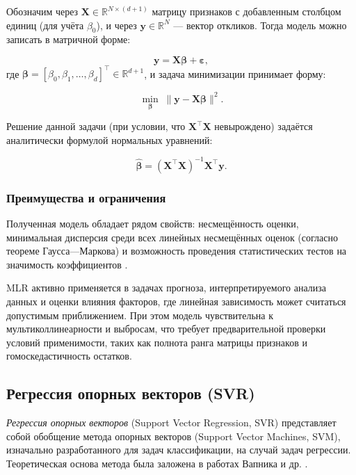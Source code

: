 Обозначим через $\mathbf{X} \in \mathbb{R}^{N \times (d+1)}$ матрицу признаков с добавленным столбцом единиц (для учёта $\beta_0$), и через $\mathbf{y} \in \mathbb{R}^N$ — вектор откликов. Тогда модель можно записать в матричной форме:

\begin{equation}
\mathbf{y} = \mathbf{X} \boldsymbol{\beta} + \boldsymbol{\varepsilon},
\end{equation}
где $\boldsymbol{\beta} = [\beta_0, \beta_1, \ldots, \beta_d]^\top \in \mathbb{R}^{d+1}$, и задача минимизации принимает форму:

\begin{equation}
\min_{\boldsymbol{\beta}} \; \| \mathbf{y} - \mathbf{X} \boldsymbol{\beta} \|^2.
\end{equation}

Решение данной задачи (при условии, что $\mathbf{X}^\top \mathbf{X}$ невырождено) задаётся аналитически формулой нормальных уравнений:

\begin{equation}
\hat{\boldsymbol{\beta}} = (\mathbf{X}^\top \mathbf{X})^{-1} \mathbf{X}^\top \mathbf{y}.
\end{equation}

\subsubsection{Преимущества и ограничения}

Полученная модель обладает рядом свойств: несмещённость оценки, минимальная дисперсия среди всех линейных несмещённых оценок (согласно теореме Гаусса—Маркова) и возможность проведения статистических тестов на значимость коэффициентов \cite{fisher1922, rao1973}.

MLR активно применяется в задачах прогноза, интерпретируемого анализа данных и оценки влияния факторов, где линейная зависимость может считаться допустимым приближением. При этом модель чувствительна к мультиколлинеарности и выбросам, что требует предварительной проверки условий применимости, таких как полнота ранга матрицы признаков и гомоскедастичность остатков.

\subsection{Регрессия опорных векторов (SVR)}

\textit{Регрессия опорных векторов} (Support Vector Regression, SVR) представляет собой обобщение метода опорных векторов (Support Vector Machines, SVM), изначально разработанного для задач классификации, на случай задач регрессии. Теоретическая основа метода была заложена в работах Вапника и др. \cite{vapnik1995, vapnik1997svr}.

